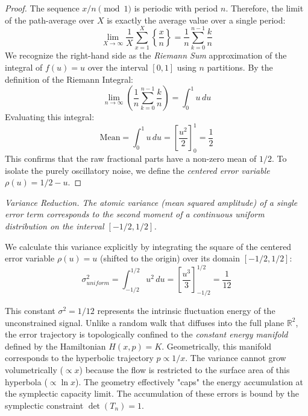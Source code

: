 \documentclass[sn-mathphys-num, pdflatex, referee]{sn-jnl}
\begin{document}
\begin{proof}
The sequence $x/n \pmod 1$ is periodic with period $n$. Therefore, the limit of the path-average over $X$ is exactly the average value over a single period:
\begin{equation}
\lim_{X \to \infty} \frac{1}{X} \sum_{x=1}^{X} \left\{\frac{x}{n}\right\} = \frac{1}{n} \sum_{k=0}^{n-1} \frac{k}{n}
\end{equation}
We recognize the right-hand side as the \textit{Riemann Sum} approximation of the integral of $f(u)=u$ over the interval $[0,1]$ using $n$ partitions. By the definition of the Riemann Integral:
\begin{equation}
\lim_{n \to \infty} \left( \frac{1}{n} \sum_{k=0}^{n-1} \frac{k}{n} \right) = \int_0^1 u \, du
\end{equation}
Evaluating this integral:
\begin{equation}
\text{Mean} = \int_0^1 u \, du = \left[ \frac{u^2}{2} \right]_0^1 = \frac{1}{2}
\end{equation}
This confirms that the raw fractional parts have a non-zero mean of $1/2$. To isolate the purely oscillatory noise, we define the \textit{centered error variable} $\rho(u) = 1/2 - u$.
\end{proof}

\textit{\textit{Variance Reduction.} \label{Variance Reduction}
The atomic variance (mean squared amplitude) of a single error term corresponds to the second moment of a continuous uniform distribution on the interval $[-1/2, 1/2]$.}

We calculate this variance explicitly by integrating the square of the centered error variable $\rho(u) = u$ (shifted to the origin) over its domain $[-1/2, 1/2]$:
\begin{equation}
\sigma^2_{uniform} = \int_{-1/2}^{1/2} u^2 \, du = \left[ \frac{u^3}{3} \right]_{-1/2}^{1/2} = \frac{1}{12}
\label{variance}
\end{equation}

This constant $\sigma^2 = 1/12$ represents the intrinsic fluctuation energy of the unconstrained signal. Unlike a random walk that diffuses into the full plane $\mathbb{R}^2$, the error trajectory is topologically confined to the \textit{constant energy manifold} defined by the Hamiltonian $H(x,p) = K$. Geometrically, this manifold corresponds to the hyperbolic trajectory $p \propto 1/x$. The variance cannot grow volumetrically ($ \propto x$) because the flow is restricted to the surface area of this hyperbola ($ \propto \ln x$). The geometry effectively "caps" the energy accumulation at the symplectic capacity limit. The accumulation of these errors is bound by the symplectic constraint $\det(T_n)=1$. 
\end{document}
